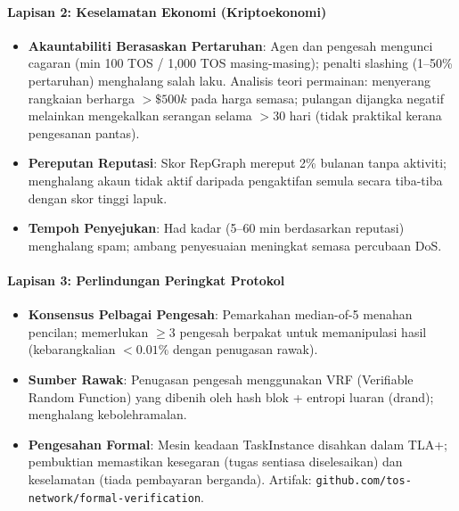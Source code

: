 \documentclass[11pt]{article}
\begin{document}
\paragraph{Lapisan 2: Keselamatan Ekonomi (Kriptoekonomi)}
\begin{itemize}[noitemsep]
  \item \textbf{Akauntabiliti Berasaskan Pertaruhan}: Agen dan pengesah mengunci cagaran (min 100 TOS / 1,000 TOS masing-masing); penalti slashing (1--50\% pertaruhan) menghalang salah laku. Analisis teori permainan: menyerang rangkaian berharga $>\$500k$ pada harga semasa; pulangan dijangka negatif melainkan mengekalkan serangan selama $>30$ hari (tidak praktikal kerana pengesanan pantas).
  \item \textbf{Pereputan Reputasi}: Skor RepGraph mereput 2\% bulanan tanpa aktiviti; menghalang akaun tidak aktif daripada pengaktifan semula secara tiba-tiba dengan skor tinggi lapuk.
  \item \textbf{Tempoh Penyejukan}: Had kadar (5--60 min berdasarkan reputasi) menghalang spam; ambang penyesuaian meningkat semasa percubaan DoS.
\end{itemize}

\paragraph{Lapisan 3: Perlindungan Peringkat Protokol}
\begin{itemize}[noitemsep]
  \item \textbf{Konsensus Pelbagai Pengesah}: Pemarkahan median-of-5 menahan pencilan; memerlukan $\geq3$ pengesah berpakat untuk memanipulasi hasil (kebarangkalian $<0.01\%$ dengan penugasan rawak).
  \item \textbf{Sumber Rawak}: Penugasan pengesah menggunakan VRF (Verifiable Random Function) yang dibenih oleh hash blok + entropi luaran (drand); menghalang kebolehramalan.
  \item \textbf{Pengesahan Formal}: Mesin keadaan TaskInstance disahkan dalam TLA+; pembuktian memastikan kesegaran (tugas sentiasa diselesaikan) dan keselamatan (tiada pembayaran berganda). Artifak: \texttt{github.com/tos-network/formal-verification}.
\end{itemize}
\end{document}
